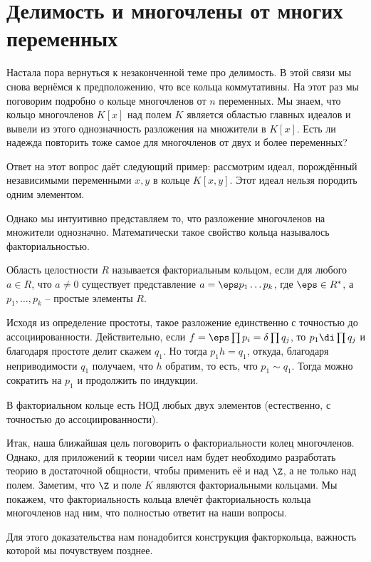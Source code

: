 \chapter{Делимость и многочлены от многих переменных}

Настала пора вернуться к незаконченной теме про делимость. В этой связи мы снова вернёмся к предположению, что все кольца коммутативны. На этот раз мы поговорим подробно о кольце многочленов от $n$ переменных. Мы знаем, что кольцо многочленов $K[x]$ над полем $K$ является областью главных идеалов и вывели из этого однозначность разложения на множители в $K[x]$. Есть ли надежда повторить тоже самое для многочленов от двух и более переменных? 

Ответ на этот вопрос даёт следующий пример: рассмотрим идеал, порождённый независимыми переменными $x,y$ в кольце $K[x,y]$. Этот идеал нельзя породить одним элементом.

Однако мы интуитивно представляем то, что разложение многочленов на множители однозначно. Математически такое свойство кольца называлось факториальностью.

\dfn
Область целостности $R$ называется факториальным кольцом, если для любого $a\in R$, что $a\neq 0$  существует представление $a=\eps p_1\dots p_k$, где $\eps \in R^*$, а $p_1,\dots,p_k$ -- простые элементы $R$.
\edfn

\rm Исходя из определение простоты, такое разложение единственно с точностью до ассоциированности. Действительно, если $f=\eps\prod p_i= \delta \prod q_j$, то $p_1 \di \prod q_j$ и благодаря простоте делит скажем $q_1$. Но тогда $p_1h=q_1$, откуда, благодаря неприводимости $q_1$ получаем, что $h$ обратим, то есть, что $p_1 \sim q_1$. Тогда можно сократить на $p_1$ и продолжить по индукции.
\erm


\rm В факториальном кольце есть НОД любых двух элементов (естественно, с точностью до ассоциированности).
\erm


Итак, наша ближайшая цель поговорить о факториальности колец многочленов. Однако, для приложений к теории чисел нам будет необходимо разработать теорию в достаточной общности, чтобы применить её и над $\Z$, а не только над полем. Заметим, что $\Z$ и поле $K$ являются факториальными кольцами. Мы покажем, что факториальность кольца влечёт факториальность кольца многочленов над ним, что полностью ответит на наши вопросы.

Для этого доказательства нам понадобится конструкция факторкольца, важность которой мы почувствуем позднее.

